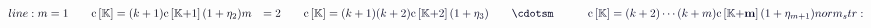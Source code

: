\documentclass[12pt]{article}
\begin{document}
\makeatletter
\renewcommand*{\@textcolor}[3]{%
  \protect\leavevmode
  \begingroup
    \color#1{#2}#3%
  \endgroup
}
\makeatother
\begin{displaymath}
\mathcolor[RGB]{0,0,15}{line:
\begin{aligned}m&=1\qquad\mathrm{c}\left[\mathbb{K}\right]=(k+1)\mathrm{c}\left[\mathbb{K}\mathbf{+}1\right](1+\eta_{2})m&=2\qquad\mathrm{c}\left[\mathbb{K}\right]=(k+} \mathcolor[RGB]{0,0,30}{1)(k+2)\mathrm{c}\left[\mathbb{K}\mathbf{+}2\right](1+\eta_{3})&\qquad\cdotsm&\qquad\mathrm{c}\left[\mathbb{K}\right]=(k+2)\cdots(k+m)\mathrm{c}\left[\mathbb{K}\mathbf{+}\mathbf{m}\right](1+\eta_{m+1})\end{aligned}

norm_str:}
\end{displaymath}
\end{document}
